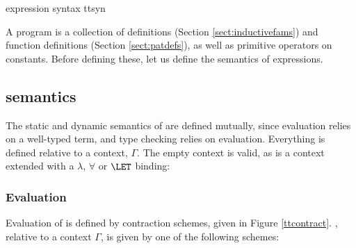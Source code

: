 {\TT{} expression syntax}
{ttsyn}

A \TT{} program is a collection of  definitions (Section 
\ref{sect:inductivefams}) and  function definitions (Section
\ref{sect:patdefs}), as well as primitive operators on constants. 
Before defining these, let us define the semantics of \TT{}
expressions.

\subsection{\TT{} semantics}

The static and dynamic semantics of \TT{} are defined mutually, since
evaluation relies on a well-typed term, and type checking relies on 
evaluation. Everything is defined relative
to a context, $\Gamma$. The empty context
is valid, as is a context extended with a $\lambda$, $\forall$ or
$\LET$ binding:


\subsubsection{Evaluation}

Evaluation of \TT{} is defined by contraction schemes, given in Figure
\ref{ttcontract}. , relative to a context $\Gamma$, is given
by one of the following schemes:

